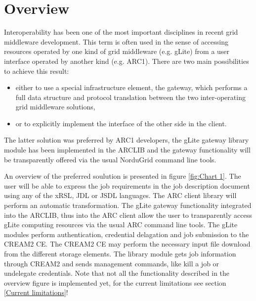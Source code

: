 \documentclass{article}
\begin{document}
\section{Overview}
\label{Overview}
Interoperability has been one of the most important disciplines in recent grid middleware development. This term is often used in the sense of accessing resources operated by one kind of grid middleware (e.g. gLite) from a user interface operated by another kind (e.g. ARC1). There are two main possibilities to achieve this result:
\begin{itemize}
\item either to use a special infrastructure element, the gateway, which performs a full data structure and protocol translation between the two inter-operating grid middleware solutions,
\item or to explicitly implement the interface of the other side in the client.
\end{itemize}
The latter solution was preferred by ARC1 developers, the gLite gateway library module has been implemented in the ARCLIB and the gateway functionality will be transparently offered via the usual NorduGrid command line tools.\par
An overview of the preferred soulution is presented in figure \ref{fig:Chart 1}. The user will be able to express the job requirements in the job description document using any of the xRSL\cite{xrsl}, JDL or JSDL\cite{jsdl} languages. The ARC client library will perform an automatic transformation. The gLite gateway functionality integrated into the ARCLIB, thus into the ARC client allow the user to transparently access gLite computing resources via the usual ARC command line tools. The gLite modules perform authentication, credential delagation and job submission to the CREAM2 CE. The CREAM2 CE may perform the necessary input file download from the different storage elements. The library module gets job information through CREAM2 and sends management commands, like kill a job or undelegate credentials. Note that not all the functionality described in the overview figure is implemented yet, for the current limitations see section \ref{Current limitations}!\par
\begin{figure}[ht]
\end{figure}
\end{document}
